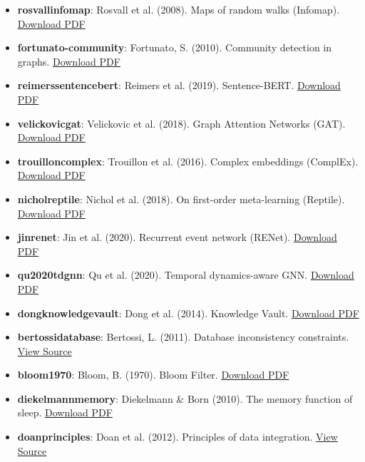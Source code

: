 \begin{itemize}
\item \textbf{rosvall\-infomap}: Rosvall et al. (2008). Maps of random walks (Infomap). \href{https://www.pnas.org/content/pnas/105/4/1118.full.pdf}{Download PDF}
\item \textbf{fortunato\--community}: Fortunato, S. (2010). Community detection in graphs. \href{https://arxiv.org/pdf/0906.0612.pdf}{Download PDF}
\item \textbf{reimers\-sente\-ncebert}: Reimers et al. (2019). Sentence-BERT. \href{https://arxiv.org/pdf/1908.10084.pdf}{Download PDF}
\item \textbf{velic\-kovic\-gat}: Velickovic et al. (2018). Graph Attention Networks (GAT). \href{https://arxiv.org/pdf/1710.10903.pdf}{Download PDF}
\item \textbf{trouillon\-complex}: Trouillon et al. (2016). Complex embeddings (ComplEx). \href{https://arxiv.org/pdf/1606.06357.pdf}{Download PDF}
\item \textbf{nichol\-reptile}: Nichol et al. (2018). On first-order meta-learning (Reptile). \href{https://arxiv.org/pdf/1803.02999.pdf}{Download PDF}
\item \textbf{jin\-renet}: Jin et al. (2020). Recurrent event network (RENet). \href{https://arxiv.org/pdf/2004.13524.pdf}{Download PDF}
\item \textbf{qu2020tdgnn}: Qu et al. (2020). Temporal dynamics-aware GNN. \href{https://arxiv.org/pdf/2002.04873.pdf}{Download PDF}
\item \textbf{dong\-knowl\-edgevault}: Dong et al. (2014). Knowledge Vault. \href{https://research.google/pubs/knowledge-vault-a-web-scale-infrastructure-for-data-fusion.pdf}{Download PDF}
\item \textbf{bertossi\-database}: Bertossi, L. (2011). Database incon\-sistency constraints. \href{https://www.morganclaypool.com/doi/abs/10.2200/S00305ED1V01Y201010DTM011}{View Source}
\item \textbf{bloom1970}: Bloom, B. (1970). Bloom Filter. \href{http://crystal.uta.edu/~mcguigan/cse6339/papers/Bloom70.pdf}{Download PDF}
\item \textbf{dieke\-lmann\-memory}: Diekelmann \& Born (2010). The memory function of sleep. \href{https://www.nature.com/articles/nrn2762.pdf}{Download PDF}
\item \textbf{doan\-princ\-iples}: Doan et al. (2012). Principles of data integration. \href{https://www.sciencedirect.com/book/9780124158146/principles-of-data-integration}{View Source}

\end{itemize}
